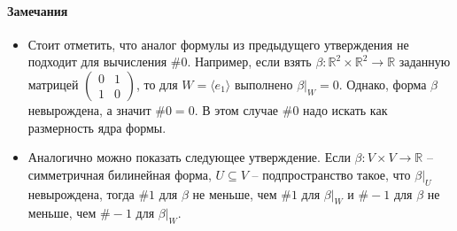 \paragraph{Замечания}
\begin{itemize}
\item Стоит отметить, что аналог формулы из предыдущего утверждения не подходит для вычисления $\#0$. Например, если взять $\beta\colon \mathbb R^2 \times \mathbb R^2 \to \mathbb R$ заданную матрицей $\left(\begin{smallmatrix}{0}&{1}\\{1}&{0}\end{smallmatrix}\right)$, то для $W = \langle e_1\rangle$ выполнено $\beta|_W = 0$. Однако, форма $\beta$ невырождена, а значит $\#0 = 0$. В этом случае $\#0$ надо искать как размерность ядра формы.

\item Аналогично можно показать следующее утверждение. Если $\beta\colon V\times V\to \mathbb R$ -- симметричная билинейная форма, $U\subseteq V$ -- подпространство такое, что $\beta|_U$ невырождена, тогда $\# 1$ для $\beta$ не меньше, чем $\# 1$ для $\beta|_W$ и $\#-1$ для $\beta$ не меньше, чем $\#-1$ для $\beta|_W$.
\end{itemize}
